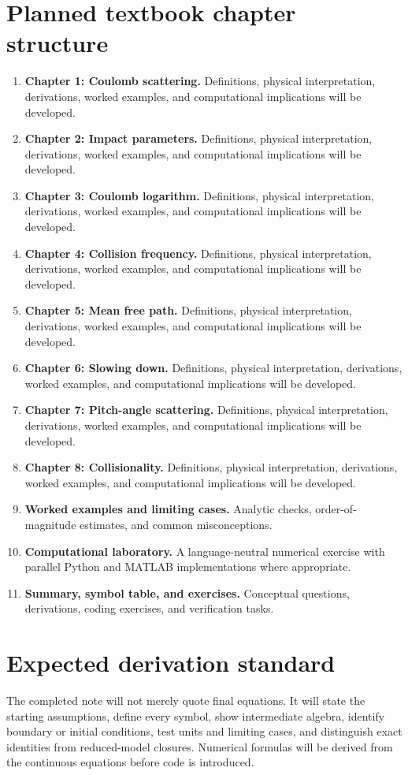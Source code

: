 \documentclass[11pt]{article}
\begin{document}
\section{Planned textbook chapter structure}
\begin{enumerate}[leftmargin=1.8em]
\item \textbf{Chapter 1: Coulomb scattering.} Definitions, physical interpretation, derivations, worked examples, and computational implications will be developed.
\item \textbf{Chapter 2: Impact parameters.} Definitions, physical interpretation, derivations, worked examples, and computational implications will be developed.
\item \textbf{Chapter 3: Coulomb logarithm.} Definitions, physical interpretation, derivations, worked examples, and computational implications will be developed.
\item \textbf{Chapter 4: Collision frequency.} Definitions, physical interpretation, derivations, worked examples, and computational implications will be developed.
\item \textbf{Chapter 5: Mean free path.} Definitions, physical interpretation, derivations, worked examples, and computational implications will be developed.
\item \textbf{Chapter 6: Slowing down.} Definitions, physical interpretation, derivations, worked examples, and computational implications will be developed.
\item \textbf{Chapter 7: Pitch-angle scattering.} Definitions, physical interpretation, derivations, worked examples, and computational implications will be developed.
\item \textbf{Chapter 8: Collisionality.} Definitions, physical interpretation, derivations, worked examples, and computational implications will be developed.
\item \textbf{Worked examples and limiting cases.} Analytic checks, order-of-magnitude estimates, and common misconceptions.
\item \textbf{Computational laboratory.} A language-neutral numerical exercise with parallel Python and MATLAB implementations where appropriate.
\item \textbf{Summary, symbol table, and exercises.} Conceptual questions, derivations, coding exercises, and verification tasks.
\end{enumerate}

\section{Expected derivation standard}
The completed note will not merely quote final equations. It will state the starting assumptions, define every symbol, show intermediate algebra, identify boundary or initial conditions, test units and limiting cases, and distinguish exact identities from reduced-model closures. Numerical formulas will be derived from the continuous equations before code is introduced.
\end{document}
